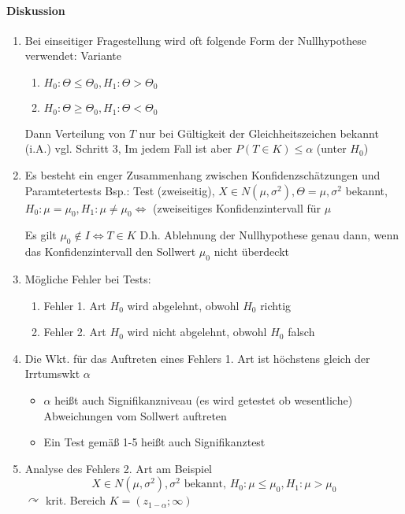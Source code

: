 \documentclass[a4paper]{scrartcl}
\begin{document}
\paragraph{Diskussion}
\begin{enumerate}
\item Bei einseitiger Fragestellung wird oft folgende Form der Nullhypothese verwendet:
Variante 
\begin{enumerate} 
\item $H_0 : \Theta \leq \Theta_0, H_1 : \Theta > \Theta_0$
\item $H_0 : \Theta \geq \Theta_0, H_1 : \Theta < \Theta_0$
\end{enumerate}
Dann Verteilung von $T$ nur bei Gültigkeit der Gleichheitszeichen bekannt (i.A.) vgl. Schritt 3, Im jedem Fall ist aber $P(T \in K) \leq \alpha$ (unter $H_0$)

\item Es besteht ein enger Zusammenhang zwischen Konfidenzschätzungen und Paramtetertests
Bsp.: Test (zweiseitig), $X \in N (\mu,\sigma^2), \Theta = \mu, \sigma^2$ bekannt,
$H_0: \mu = \mu_0, H_1 : \mu \neq \mu_0 \Leftrightarrow$ (zweiseitiges Konfidenzintervall für $\mu$

Es gilt $\mu_0 \notin I \Leftrightarrow T \in K$
D.h. Ablehnung der Nullhypothese genau dann, wenn das Konfidenzintervall den Sollwert $\mu_0$ nicht überdeckt

\item Mögliche Fehler bei Tests:
    \begin{enumerate}
    \item Fehler 1. Art $H_0$ wird abgelehnt, obwohl $H_0$ richtig
    \item Fehler 2. Art $H_0$ wird nicht abgelehnt, obwohl $H_0$ falsch
    \end{enumerate}

\item Die Wkt. für das Auftreten eines Fehlers 1. Art ist höchstens gleich der Irrtumswkt $\alpha$
    \begin{itemize}
    \item $\alpha$ heißt auch Signifikanzniveau (es wird getestet ob wesentliche) Abweichungen vom Sollwert auftreten
    \item Ein Test gemäß 1-5 heißt auch Signifikanztest
    \end{itemize}

\item Analyse des Fehlers 2. Art am Beispiel
\[ X \in N (\mu,\sigma^2), \sigma^2 \text{ bekannt, } H_0 : \mu \leq \mu_0, H_1 : \mu > \mu_0\]
$\curvearrowright$ krit. Bereich $K= (z_{1-\alpha}; \infty)$


\end{enumerate}
\end{document}
